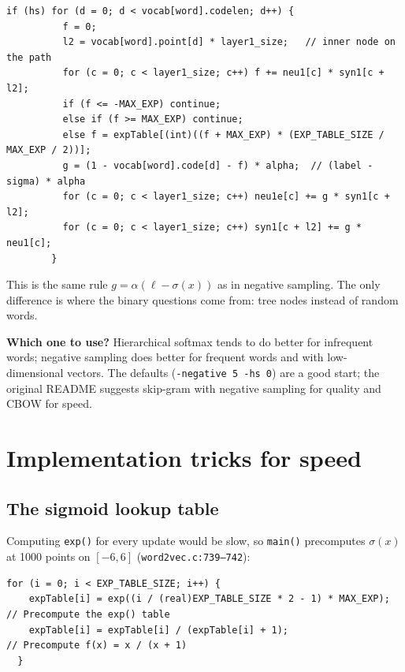 \documentclass[11pt,a4paper]{article}
\newcommand{\code}[1]{\texttt{#1}}
\newcommand{\src}[1]{\texttt{word2vec.c:#1}}
\newenvironment{note}
  {\par\smallskip\noindent\begin{lrbox}{\notebox}\begin{minipage}{\dimexpr\linewidth-2\fboxsep-2\fboxrule\relax}\small}
  {\end{minipage}\end{lrbox}\fcolorbox{incol!40}{notebg}{\usebox{\notebox}}\par\smallskip}
\begin{document}
\begin{lstlisting}[firstnumber=464]
        if (hs) for (d = 0; d < vocab[word].codelen; d++) {
          f = 0;
          l2 = vocab[word].point[d] * layer1_size;   // inner node on the path
          for (c = 0; c < layer1_size; c++) f += neu1[c] * syn1[c + l2];
          if (f <= -MAX_EXP) continue;
          else if (f >= MAX_EXP) continue;
          else f = expTable[(int)((f + MAX_EXP) * (EXP_TABLE_SIZE / MAX_EXP / 2))];
          g = (1 - vocab[word].code[d] - f) * alpha;  // (label - sigma) * alpha
          for (c = 0; c < layer1_size; c++) neu1e[c] += g * syn1[c + l2];
          for (c = 0; c < layer1_size; c++) syn1[c + l2] += g * neu1[c];
        }
\end{lstlisting}

This is the same rule $g=\alpha(\ell-\sigma(x))$ as in negative sampling. The only
difference is where the binary questions come from: tree nodes instead of random
words.

\begin{note}
\textbf{Which one to use?} Hierarchical softmax tends to do better for
infrequent words; negative sampling does better for frequent words and with
low-dimensional vectors. The defaults (\code{-negative 5 -hs 0}) are a good start;
the original README suggests skip-gram with negative sampling for quality and
CBOW for speed.
\end{note}

\section{Implementation tricks for speed}

\subsection{The sigmoid lookup table}

Computing \code{exp()} for every update would be slow, so \code{main()} precomputes
$\sigma(x)$ at 1000 points on $[-6,6]$ (\src{739--742}):

\begin{lstlisting}[firstnumber=739]
  for (i = 0; i < EXP_TABLE_SIZE; i++) {
    expTable[i] = exp((i / (real)EXP_TABLE_SIZE * 2 - 1) * MAX_EXP); // Precompute the exp() table
    expTable[i] = expTable[i] / (expTable[i] + 1);                   // Precompute f(x) = x / (x + 1)
  }
\end{lstlisting}
\end{document}
